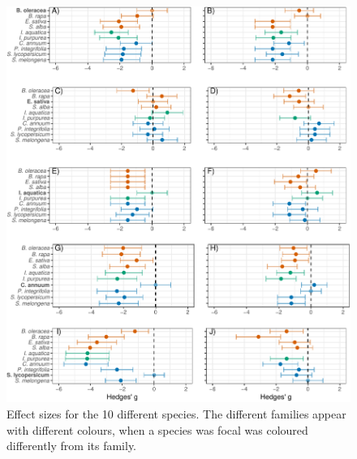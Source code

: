 \documentclass[11pt,a4paper]{article}
\begin{document}
\newpage

\begin{figure}
\centering
\includegraphics{output/figures/unnamed-chunk-5-1.pdf}
\caption{Effect sizes for the 10 different species. The different
families appear with different colours, when a species was focal was
coloured differently from its family.}
\end{figure}

\newpage
\end{document}
